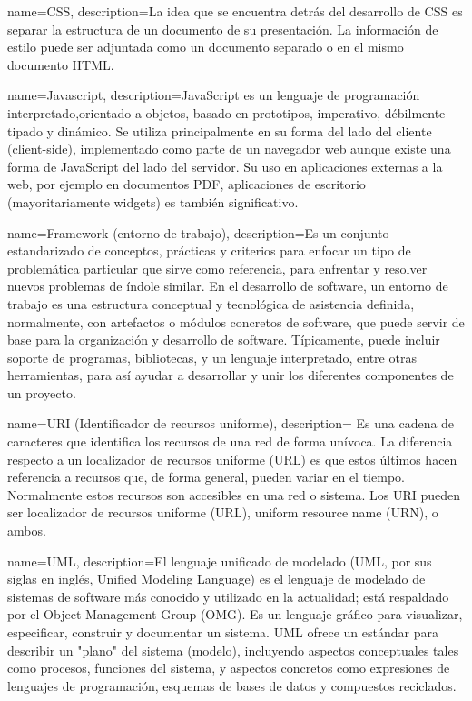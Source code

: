 {name=CSS,
description={La idea que se encuentra detrás del desarrollo de CSS es separar la estructura de un documento de su presentación. La información de estilo puede ser adjuntada como un documento separado o en el mismo documento HTML.}
}

{name=Javascript,
description={JavaScript es un lenguaje de programación interpretado,orientado a objetos, basado en prototipos, imperativo, débilmente tipado y dinámico. Se utiliza principalmente en su forma del lado del cliente (client-side), implementado como parte de un navegador web aunque existe una forma de JavaScript del lado del servidor. Su uso en aplicaciones externas a la web, por ejemplo en documentos PDF, aplicaciones de escritorio (mayoritariamente widgets) es también significativo.}
}

{name=Framework (entorno de trabajo),
description={Es un conjunto estandarizado de conceptos, prácticas y criterios para enfocar un tipo de problemática particular que sirve como referencia, para enfrentar y resolver nuevos problemas de índole similar.
En el desarrollo de software, un entorno de trabajo es una estructura conceptual y tecnológica de asistencia definida, normalmente, con artefactos o módulos concretos de software, que puede servir de base para la organización y desarrollo de software. Típicamente, puede incluir soporte de programas, bibliotecas, y un lenguaje interpretado, entre otras herramientas, para así ayudar a desarrollar y unir los diferentes componentes de un proyecto.}
}

{name=URI (Identificador de recursos uniforme),
description={ Es una cadena de caracteres que identifica los recursos de una red de forma unívoca. La diferencia respecto a un localizador de recursos uniforme (URL) es que estos últimos hacen referencia a recursos que, de forma general, pueden variar en el tiempo. Normalmente estos recursos son accesibles en una red o sistema. Los URI pueden ser localizador de recursos uniforme (URL), uniform resource name (URN), o ambos.}
}

{name=UML,
description={El lenguaje unificado de modelado (UML, por sus siglas en inglés, Unified Modeling Language) es el lenguaje de modelado de sistemas de software más conocido y utilizado en la actualidad; está respaldado por el Object Management Group (OMG).
Es un lenguaje gráfico para visualizar, especificar, construir y documentar un sistema. UML ofrece un estándar para describir un "plano" del sistema (modelo), incluyendo aspectos conceptuales tales como procesos, funciones del sistema, y aspectos concretos como expresiones de lenguajes de programación, esquemas de bases de datos y compuestos reciclados.}
}

